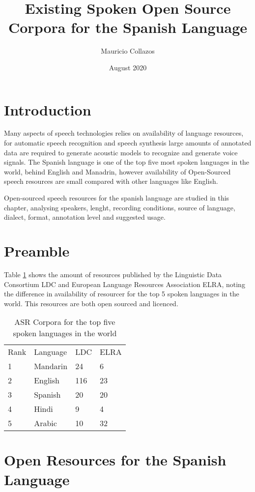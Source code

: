 \documentclass{article}
\title{Existing Spoken Open Source Corpora for the Spanish Language}
\author{Mauricio Collazos}
\date{August 2020}
\begin{document}
\maketitle

\section{Introduction}

Many aspects of speech technologies relies on availability of language resources, for automatic speech recognition and speech synthesis large amounts of annotated data are required to generate acoustic models to recognize and generate voice signals. The Spanish language is one of the top five most spoken languages in the world, behind English and Manadrin, however availability of Open-Sourced speech resources are small compared with other languages like English.

Open-sourced speech resources for the spanish language are studied in this chapter, analysing speakers, lenght, recording conditions, source of language, dialect, format, annotation level and suggested usage.


\section{Preamble}

Table \ref{tab:resources_by_langauge} shows the amount of resources published by the Linguistic Data Consortium LDC and European Language Resources Association ELRA, noting the difference in availability of resourcer for the top 5 spoken languages in the world. This resources are both open sourced and licenced.


\begin{table}[h]
\caption{ASR Corpora for the top five spoken languages in the world \cite{HernndezMena2017}}
\label{tab:resources_by_langauge}
\begin{tabular}{llll}
Rank & Language & LDC & ELRA \\
1    & Mandarin & 24  & 6    \\
2    & English  & 116 & 23   \\
3    & Spanish  & 20  & 20   \\
4    & Hindi    & 9   & 4    \\
5    & Arabic   & 10  & 32  
\end{tabular}
\end{table}

\section{Open Resources for the Spanish Language}
\end{document}
